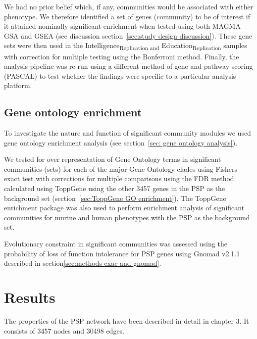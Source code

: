 We had no prior belief which, if any, communities would be associated with either phenotype. We therefore identified a set of genes (community) to be of interest if it attained nominally significant enrichment when tested using both MAGMA GSA and GSEA (see discussion section~\ref{sec:study design discussion}). These gene sets were then used in the Intelligence\textsubscript{Replication and }Education\textsubscript{Replication} samples with correction  for multiple testing using the Bonferroni method. Finally, the analysis pipeline was re-run using a different method of gene and pathway scoring (PASCAL) to test whether the findings were specific to a particular analysis platform\cite{lamparter2016fast}.  







\subsection{Gene ontology enrichment}
\label{sec:gene ontology methods from chapter community detection}
To investigate the nature and function of significant community modules we used gene ontology enrichment analysis (see section~\ref{sec: gene ontology analysis})\cite{mi2013large}.  

 We tested for over representation of Gene Ontology terms in significant communities (sets) for each of the major Gene Ontology clades using Fishers exact test with corrections for multiple comparisons using the FDR method calculated using ToppGene\cite{chen2009toppgene} using the other 3457 genes in the PSP as the background set (section~\ref{sec:ToppGene GO enrichment}). The ToppGene enrichment package was also used to perform enrichment analysis of significant communities for murine and human phenotypes with the PSP as the background set\cite{chen2009toppgene}.  

Evolutionary constraint in significant communities was assessed using the probability of loss of function intolerance for PSP genes using Gnomad v2.1.1 described in section\ref{sec:methods exac and gnomad}.


\section{Results}

The properties of the PSP network have been described in detail in chapter 3. It consists of 3457 nodes and 30498 edges. 

